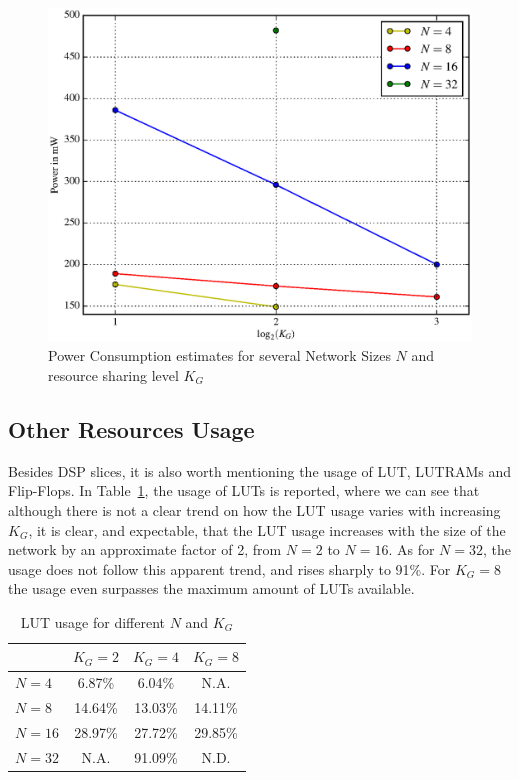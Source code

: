 \begin{figure}
    \centering
    \includegraphics[width=\linewidth]{figures/power.eps}
    \caption[Power consumption estimates for several Network Sizes $N$ and resource sharing level $K_G$]{Power Consumption estimates for several Network Sizes $N$ and resource sharing level $K_G$}
    \label{fig:power}
\end{figure}

\subsection{Other Resources Usage}\label{sec:res-synth-otheres}
Besides DSP slices, it is also worth mentioning the usage of LUT, LUTRAMs and Flip-Flops. In Table~\ref{tab:lut}, the usage of LUTs is reported, where we can see that although there is not a clear trend on how the LUT usage varies with increasing $K_G$, it is clear, and expectable, that the LUT usage increases with the size of the network by an approximate factor of 2, from $N=2$ to $N=16$. As for $N=32$, the usage does not follow this apparent trend, and rises sharply to 91\%. For $K_G = 8$ the usage even surpasses the maximum amount of LUTs available.
\begin{table}
    \centering
  \begin{tabular}{ | l | c | c | c |}
    \hline
    & $K_G=2$  & $K_G=4$ & $K_G=8$ \\ 
    \hline
    $N=4$ & 6.87\% & 6.04\% & N.A. \\    
    \hline
    $N=8$ & 14.64\% & 13.03\% & 14.11\% \\    
    \hline
    $N=16$ & 28.97\% & 27.72\% & 29.85\% \\    
    \hline
    $N=32$ & N.A. & 91.09\% & N.D. \\    
\hline
  \end{tabular}
    \caption{LUT usage for different $N$ and $K_G$}
    \label{tab:lut}
\end{table}

